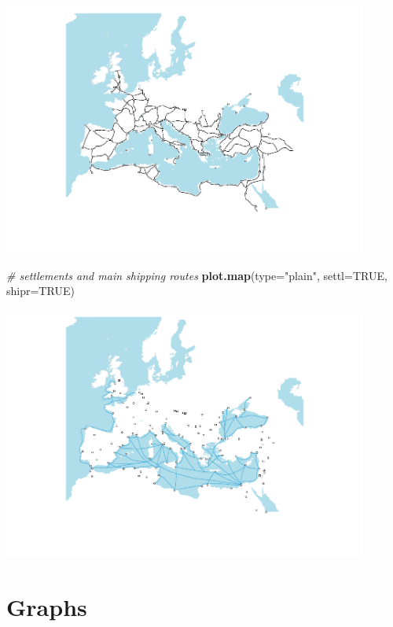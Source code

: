 \documentclass[a4paper,11pt]{memoir}
\newenvironment{Shaded}{\begin{snugshade}}{\end{snugshade}}
\newcommand{\CommentTok}[1]{\textcolor[rgb]{0.56,0.35,0.01}{\textit{#1}}}
\newcommand{\DataTypeTok}[1]{\textcolor[rgb]{0.13,0.29,0.53}{#1}}
\newcommand{\KeywordTok}[1]{\textcolor[rgb]{0.13,0.29,0.53}{\textbf{#1}}}
\newcommand{\NormalTok}[1]{#1}
\newcommand{\OtherTok}[1]{\textcolor[rgb]{0.56,0.35,0.01}{#1}}
\newcommand{\StringTok}[1]{\textcolor[rgb]{0.31,0.60,0.02}{#1}}
\begin{document}
{\centering
\includegraphics[width=12cm, trim=0 0 0 0, clip]{img/unnamed-chunk-8-1} %
}

\begin{Shaded}
\begin{Highlighting}[]
\CommentTok{# settlements and main shipping routes}
\KeywordTok{plot.map}\NormalTok{(}\DataTypeTok{type=}\StringTok{"plain"}\NormalTok{, }\DataTypeTok{settl=}\OtherTok{TRUE}\NormalTok{, }\DataTypeTok{shipr=}\OtherTok{TRUE}\NormalTok{)}
\end{Highlighting}
\end{Shaded}

{\centering
\includegraphics[width=12cm, trim=0 0 0 0, clip]{img/unnamed-chunk-9-1} %
}

\hypertarget{graphs}{%
\section{Graphs}\label{graphs}}
\end{document}
